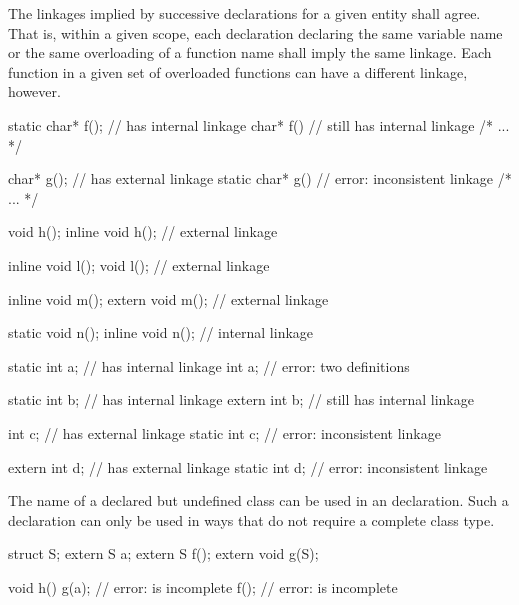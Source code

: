 \pnum
The linkages implied by successive declarations for a given entity shall
agree. That is, within a given scope, each declaration declaring the
same variable name or the same overloading of a function name shall imply
the same linkage. Each function in a given set of overloaded functions
can have a different linkage, however.
\begin{example}
%

\begin{codeblock}
static char* f();               //  has internal linkage
char* f()                       //  still has internal linkage
  { /* ... */ }

char* g();                      //  has external linkage
static char* g()                // error: inconsistent linkage
  { /* ... */ }

void h();
inline void h();                // external linkage

inline void l();
void l();                       // external linkage

inline void m();
extern void m();                // external linkage

static void n();
inline void n();                // internal linkage

static int a;                   //  has internal linkage
int a;                          // error: two definitions

static int b;                   //  has internal linkage
extern int b;                   //  still has internal linkage

int c;                          //  has external linkage
static int c;                   // error: inconsistent linkage

extern int d;                   //  has external linkage
static int d;                   // error: inconsistent linkage
\end{codeblock}
\end{example}

\pnum
{}%
The name of a declared but undefined class can be used in an
 declaration. Such a declaration can only be used in ways
that do not require a complete class type.
\begin{example}

\begin{codeblock}
struct S;
extern S a;
extern S f();
extern void g(S);

void h() {
  g(a);                         // error:  is incomplete
  f();                          // error:  is incomplete
}
\end{codeblock}
\end{example}

